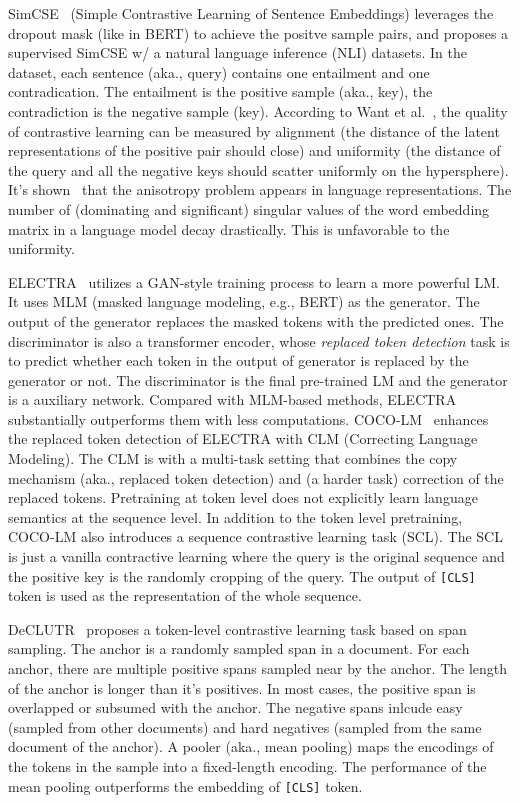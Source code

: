 SimCSE~ (Simple Contrastive Learning of Sentence Embeddings) leverages the dropout mask (like in BERT) to achieve the positve sample pairs, and proposes a supervised SimCSE w/ a natural language inference (NLI) datasets.
In the dataset, each sentence (aka., query) contains one entailment and one contradication.
The entailment is the positive sample (aka., key), the contradiction is the negative sample (key).
According to Want et al.~, the quality of contrastive learning can be measured by alignment (the distance of the latent representations of the positive pair should close) and uniformity (the distance of the query and all the negative keys should scatter uniformly on the hypersphere).
It's shown~ that the anisotropy problem appears in language representations.
The number of (dominating and significant) singular values of the word embedding matrix in a language model decay drastically.
This is unfavorable to the uniformity.

ELECTRA~ utilizes a GAN-style training process to learn a more powerful LM.
It uses MLM (masked language modeling, e.g., BERT) as the generator.
The output of the generator replaces the masked tokens with the predicted ones.
The discriminator is also a transformer encoder, whose \emph{replaced token detection} task is to predict whether each token in the output of generator is replaced by the generator or not.
The discriminator is the final pre-trained LM and the generator is a auxiliary network.
Compared with MLM-based methods, ELECTRA substantially outperforms them with less computations.
COCO-LM~ enhances the replaced token detection of ELECTRA with CLM (Correcting Language Modeling).
The CLM is with a multi-task setting that combines the copy mechanism (aka., replaced token detection) and (a harder task) correction of the replaced tokens.
Pretraining at token level does not explicitly learn language semantics at the sequence level.
In addition to the token level pretraining, COCO-LM also introduces a sequence contrastive learning task (SCL).
The SCL is just a vanilla contractive learning where the query is the original sequence and the positive key is the randomly cropping of the query.
The output of \texttt{[CLS]} token is used as the representation of the whole sequence.

DeCLUTR~ proposes a token-level contrastive learning task based on span sampling.
The anchor is a randomly sampled span in a document.
For each anchor, there are multiple positive spans sampled near by the anchor.
The length of the anchor is longer than it's positives.
In most cases, the positive span is overlapped or subsumed with the anchor.
The negative spans inlcude easy (sampled from other documents) and hard negatives (sampled from the same document of the anchor).
A pooler (aka., mean pooling) maps the encodings of the tokens in the sample into a fixed-length encoding.
The performance of the mean pooling outperforms the embedding of \texttt{[CLS]} token.



